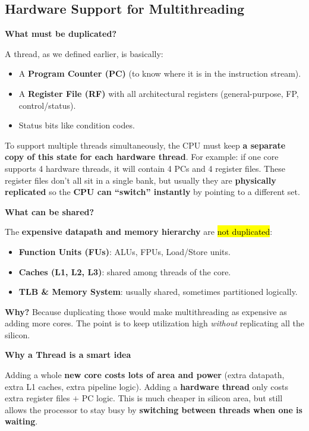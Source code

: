 \subsection{Hardware Support for Multithreading}

\begin{flushleft}
    \textcolor{Green3}{ \textbf{What must be duplicated?}}
\end{flushleft}
A thread, as we defined earlier, is basically:
\begin{itemize}
    \item A \textbf{Program Counter (PC)} (to know where it is in the instruction stream).
    \item A \textbf{Register File (RF)} with all architectural registers (general-purpose, FP, control/status).
    \item Status bits like condition codes.
\end{itemize}
To support multiple threads simultaneously, the CPU must keep \textbf{a separate copy of this state for each hardware thread}. For example: if one core supports 4 hardware threads, it will contain 4 PCs and 4 register files. These register files don't all sit in a single bank, but usually they are \textbf{physically replicated} so the \textbf{CPU can ``switch'' instantly} by pointing to a different set.

\highspace
\begin{flushleft}
    \textcolor{Green3}{ \textbf{What can be shared?}}
\end{flushleft}
The \textbf{expensive datapath and memory hierarchy} are \hl{not duplicated}:
\begin{itemize}
    \item[\textcolor{Green3}{\faIcon{share-alt}}] \textbf{Function Units (FUs)}: ALUs, FPUs, Load/Store units.
    \item[\textcolor{Green3}{\faIcon{share-alt}}] \textbf{Caches (L1, L2, L3)}: shared among threads of the core.
    \item[\textcolor{Green3}{\faIcon{share-alt}}] \textbf{TLB \& Memory System}: usually shared, sometimes partitioned logically.
\end{itemize}
\textcolor{Green3}{ \textbf{Why?}} Because duplicating those would make multithreading as expensive as adding more cores. The point is to keep utilization high \emph{without} replicating all the silicon.

\highspace
\begin{flushleft}
    \textcolor{Green3}{ \textbf{Why a Thread is a smart idea}}
\end{flushleft}
Adding a whole \textbf{new core costs lots of area and power} (extra datapath, extra L1 caches, extra pipeline logic). Adding a \textbf{hardware thread} only costs extra register files $+$ PC logic. This is much cheaper in silicon area, but still allows the processor to stay busy by \textbf{switching between threads when one is waiting}.

